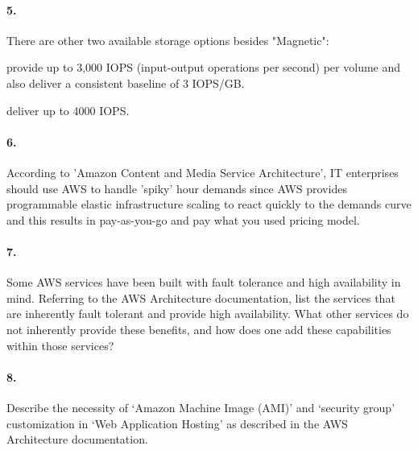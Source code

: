 \documentclass[a4paper]{article}
\begin{document}
\paragraph{5. } There are other two available storage options besides "Magnetic":
\begin{description}
\leftskip 0.4in
\parindent -0.4in
	\item[General Purpose (SSD): ] provide up to 3,000 IOPS (input-output operations per second) per volume and also deliver a consistent baseline of 3 IOPS/GB.
	\item[Provisioned IOPS (SSD): ] deliver up to 4000 IOPS.
\end{description}

\paragraph{6. } According to 'Amazon Content and Media Service Architecture', IT enterprises should use AWS to handle 'spiky' hour demands since AWS provides programmable elastic infrastructure scaling to react quickly to the demands curve and this results in pay-as-you-go and pay what you used pricing model.

\paragraph{7. } Some AWS services have been built with fault tolerance and high availability in mind. Referring to the AWS Architecture documentation, list the services that are inherently fault tolerant and provide high availability. What other services do not inherently provide these benefits, and how does one add these capabilities within those services?

\paragraph{8. } Describe the necessity of ‘Amazon Machine Image (AMI)’ and ‘security group’ customization in ‘Web Application Hosting’ as described in the AWS Architecture documentation.
\end{document}
